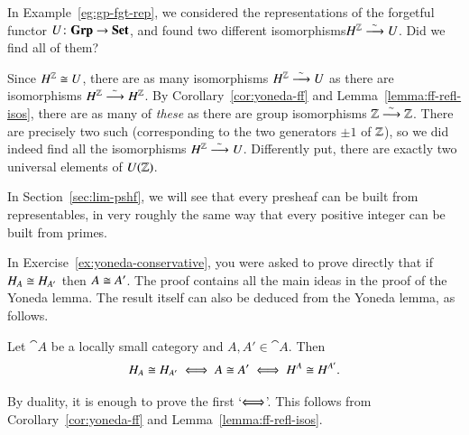 \begin{example}
In Example~\ref{eg:gp-fgt-rep}, we considered the representations of the
forgetful functor $U\from \Grp \to \Set$,%
%
%
and found two different isomorphisms\linebreak $H^{\mathbb{Z}} \stackrel{\textstyle{}_\sim}{\longrightarrow} U$.%
%
%
Did we find all of them?

Since $H^{\mathbb{Z}} \cong U$, there are as many isomorphisms $H^{\mathbb{Z}}
\stackrel{\textstyle{}_\sim}{\longrightarrow} U$ as there are isomorphisms $H^{\mathbb{Z}} \stackrel{\textstyle{}_\sim}{\longrightarrow} H^{\mathbb{Z}}$.  By
Corollary~\ref{cor:yoneda-ff} and
Lemma~\ref{lemma:ff-refl-isos}, there are
as many of \emph{these} as there are group isomorphisms $\mathbb{Z} \stackrel{\textstyle{}_\sim}{\longrightarrow}
\mathbb{Z}$.  There are precisely two such (corresponding to the two
generators $\pm 1$ of $\mathbb{Z}$), so we did indeed find all the
isomorphisms $H^{\mathbb{Z}} \stackrel{\textstyle{}_\sim}{\longrightarrow} U$.  Differently put, there are exactly
two universal elements of $U(\mathbb{Z})$.
\end{example}

In Section~\ref{sec:lim-pshf}, we will see that every presheaf can be built
from representables, in very roughly the same way that every positive
integer can be built from primes.%
%
%


%
%

In Exercise~\ref{ex:yoneda-conservative}, you were asked to prove directly
that if $H_A \cong H_{A'}$ then $A \cong A'$.  The proof contains all the
main ideas in the proof of the Yoneda lemma.  The result itself can also be
deduced from the Yoneda lemma, as follows.

\begin{cor}
\label{cor:reps-unique}
Let $\cat{A}$ be a locally small category and $A, A' \in \cat{A}$.  Then
\[
H_A \cong H_{A'}
\iff
A \cong A'
\iff
H^A \cong H^{A'}.
\]
\end{cor}

\begin{pf}
By duality, it is enough to prove the first `$\Longleftrightarrow$'.  This follows from
Corollary~\ref{cor:yoneda-ff} and
Lemma~\ref{lemma:ff-refl-isos}.
\end{pf}

